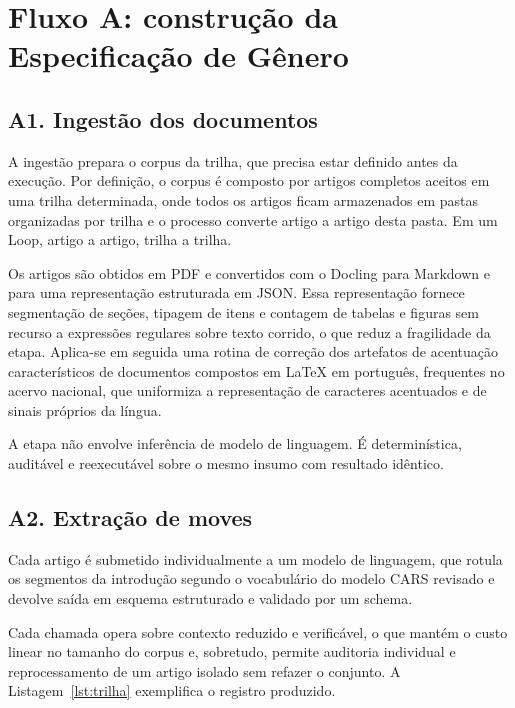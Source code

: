 \section{Fluxo A: construção da Especificação de Gênero}
\label{sec:fluxo-a}

\subsection*{A1. Ingestão dos documentos}

A ingestão prepara o corpus da trilha, que precisa estar definido antes da execução. Por definição, o corpus é composto por artigos completos aceitos em uma trilha determinada, onde todos os artigos ficam armazenados em pastas organizadas por trilha e o processo converte artigo a artigo desta pasta. Em um Loop, artigo a artigo, trilha a trilha.

Os artigos são obtidos em PDF e convertidos com o Docling \cite{Docling} para Markdown e para uma representação estruturada em JSON. Essa representação fornece segmentação de seções, tipagem de itens e contagem de tabelas e figuras sem recurso a expressões regulares sobre texto corrido, o que reduz a fragilidade da etapa. Aplica-se em seguida uma rotina de correção dos artefatos de acentuação característicos de documentos compostos em \LaTeX{} em português, frequentes no acervo nacional, que uniformiza a representação de caracteres acentuados e de sinais próprios da língua.

A etapa não envolve inferência de modelo de linguagem. É determinística, auditável e reexecutável sobre o mesmo insumo com resultado idêntico.

\subsection*{A2. Extração de \textbf{moves}}

Cada artigo é submetido individualmente a um modelo de linguagem, que rotula os segmentos da introdução segundo o vocabulário do modelo CARS revisado \cite{ResearchGenres} e devolve saída em esquema estruturado e validado por um schema.

Cada chamada opera sobre contexto reduzido e verificável, o que mantém o custo linear no tamanho do corpus e, sobretudo, permite auditoria individual e reprocessamento de um artigo isolado sem refazer o conjunto. A Listagem~\ref{lst:trilha} exemplifica o registro produzido.


